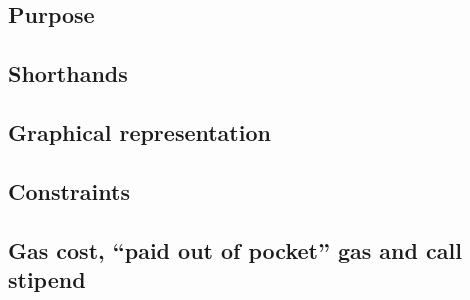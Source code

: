 \subsection{Purpose}                                                       \label{stp: lookups: call introduction}   
\subsection{Shorthands}                                                    \label{stp: lookups: call shorthands}     
\subsection{Graphical representation}                                      \label{stp: lookups: call rep}            
\subsection{Constraints}                                                   \label{stp: lookups: call constraints}    
\subsection{Gas cost, ``paid out of pocket'' gas and call stipend}         \label{stp: lookups: call  setting}       
